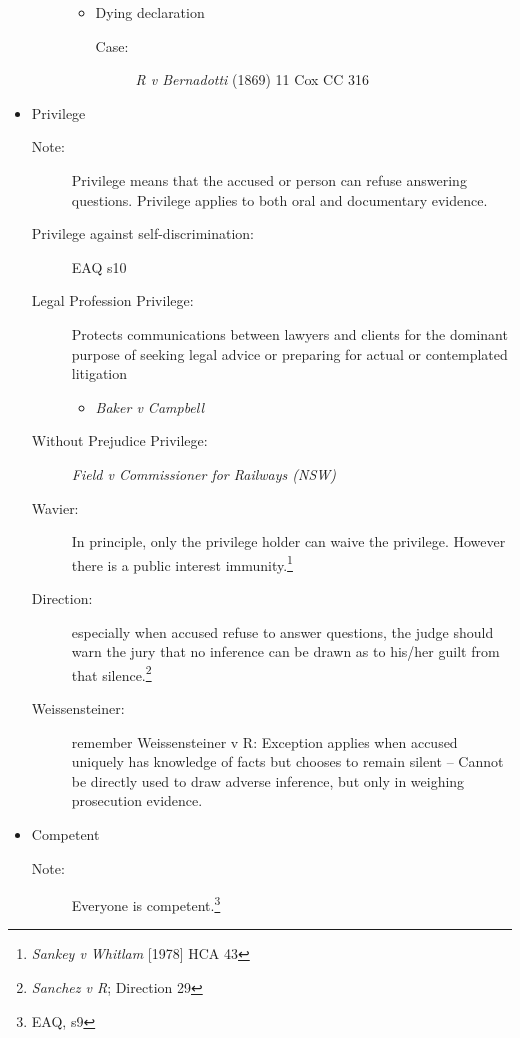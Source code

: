 \begin{itemize}
\begin{description}
\begin{itemize}
                    \item Dying declaration
                        \begin{description}
                            \item[Case:] \textit{R v Bernadotti} (1869) 11 Cox CC 316 
                        \end{description}
                \end{itemize}
        \end{description}
    \item Privilege
        \begin{description}
            \item[Note:] Privilege means that the accused or person can refuse answering questions. Privilege applies to both oral and documentary evidence. 
            \item[Privilege against self-discrimination:]EAQ s10 
            \item[Legal Profession Privilege:]Protects communications between lawyers and clients for the dominant purpose of seeking legal advice or preparing for actual or contemplated litigation
                \begin{itemize}
                    \item \textit{Baker v Campbell}
                \end{itemize}
            \item[Without Prejudice Privilege:]\textit{Field v Commissioner for Railways (NSW)}
            \item[Wavier:] In principle, only the privilege holder can waive the privilege. However there is a public interest immunity.\footnote{\textit{Sankey v Whitlam} [1978] HCA 43}
            \item[Direction:]especially when accused refuse to answer questions, the judge should warn the jury that no inference can be drawn as to his/her guilt from that silence.\footnote{\textit{Sanchez v R}; Direction 29}
            \item[Weissensteiner:] remember Weissensteiner v R: Exception applies when accused uniquely has knowledge of facts but chooses to remain silent – Cannot be directly used to draw adverse inference, but only in weighing prosecution evidence. 
        \end{description}
    \item Competent
        \begin{description}
            \item[Note:] Everyone is competent.\footnote{EAQ, s9}
        \end{description}


\end{itemize}

